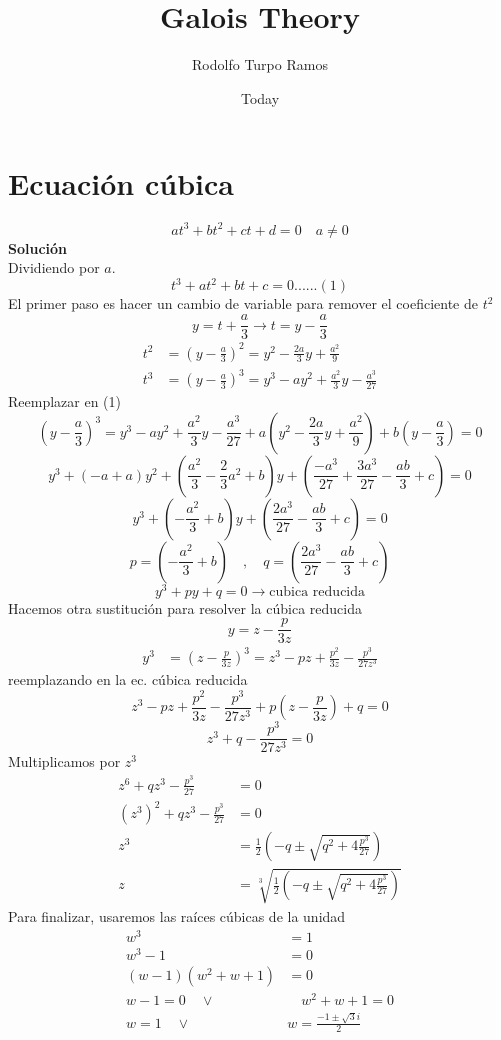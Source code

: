 \documentclass{article}
\title{Galois Theory}
\author{Rodolfo Turpo Ramos}
\date{Today}
\begin{document}
\maketitle
\section{Ecuación cúbica}
\[at^3+bt^2+ct+d=0\quad a\neq 0\]
\textbf{\large Solución}\\
Dividiendo por $a$.
\[t^3+at^2+bt+c=0......(1)\]
El primer paso es hacer un cambio de variable para remover el coeficiente de $t^2$
\[y=t+\frac{a}{3}\rightarrow t=y-\frac{a}{3}\]
\begin{align*}
    t^2&=\left(y-\frac{a}{3}\right)^2=y^2-\frac{2a}{3}y+\frac{a^2}{9}\\
    t^3&=\left(y-\frac{a}{3}\right)^3=y^3-ay^2+\frac{a^2}{3}y-\frac{a^3}{27}
\end{align*}
Reemplazar en (1)
\[\left(y-\frac{a}{3}\right)^3=y^3-ay^2+\frac{a^2}{3}y-\frac{a^3}{27}+a\left(y^2-\frac{2a}{3}y+\frac{a^2}{9}\right)+b\left(y-\frac{a}{3}\right)=0\]
\[y^3+\left(-a+a\right)y^2+\left(\frac{a^2}{3}-\frac{2}{3}a^2+b\right)y+\left(\frac{-a^3}
{27}+\frac{3a^3}{27}-\frac{ab}{3}+c\right)=0\]
\[y^3+\left(-\frac{a^2}{3}+b\right)y+\left(\frac{2a^3}
{27}-\frac{ab}{3}+c\right)=0\]
\[p=\left(-\frac{a^2}{3}+b\right)\quad,\quad q=\left(\frac{2a^3}
{27}-\frac{ab}{3}+c\right)\]
\[y^3+py+q=0\rightarrow\text{cubica reducida}\]
Hacemos otra sustitución para resolver la cúbica reducida
\[y=z-\frac{p}{3z}\]
\begin{align*}
    y^3&=\left(z-\frac{p}{3z}\right)^3=z^3-pz+\frac{p^2}{3z}-\frac{p^3}{27z^3}
\end{align*}
reemplazando en la ec. cúbica reducida
\[z^3-pz+\frac{p^2}{3z}-\frac{p^3}{27z^3}+p\left(z-\frac{p}{3z}\right)+q=0\]
\[z^3+q-\frac{p^3}{27z^3}=0\]
Multiplicamos por $z^3$
\begin{align*}
    z^6+qz^3-\frac{p^3}{27}&=0\\
    (z^3)^2+qz^3-\frac{p^3}{27}&=0\\
    z^3&=\frac{1}{2}\left(-q\pm\sqrt{q^2+4\frac{p^3}{27}}\right)\\
    z&=\sqrt[3]{\frac{1}{2}\left(-q\pm\sqrt{q^2+4\frac{p^3}{27}}\right)}
\end{align*}
Para finalizar, usaremos las raíces cúbicas de la unidad
\begin{align*}
    w^3&=1\\
    w^3-1&=0\\
    (w-1)(w^2+w+1)&=0\\
    w-1=0\quad\lor&\quad w^2+w+1=0\\
    w=1\quad\lor\quad& w=\frac{-1\pm\sqrt{3}i}{2}
\end{align*}
\end{document}
